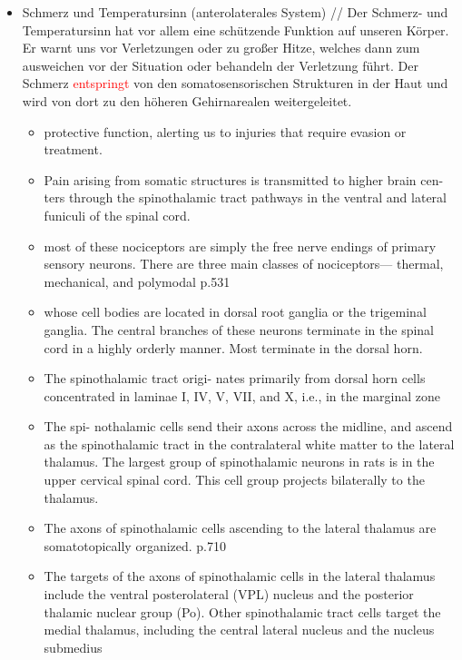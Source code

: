 \documentclass[12pt,a4paper,pdftex]{article}
\begin{document}
\begin{itemize}
    \item Schmerz und Temperatursinn (anterolaterales System)
    //
    Der Schmerz- und Temperatursinn hat vor allem eine schützende Funktion auf unseren Körper. Er warnt uns vor Verletzungen oder zu großer Hitze, welches dann zum ausweichen vor der Situation oder behandeln der Verletzung führt. Der Schmerz \textcolor{red}{entspringt} von den somatosensorischen Strukturen in der Haut und wird von dort zu den höheren Gehirnarealen weitergeleitet. 
    \begin{itemize}
        \item protective function, alerting us to injuries that require evasion or treatment. \cite{kandel2013principles}
        \item Pain arising from
        somatic structures is transmitted to higher brain cen-
        ters through the spinothalamic tract pathways in the
        ventral and lateral funiculi of the spinal cord. \cite{paxinos2014rat}
        \item most of these nociceptors
        are simply the free nerve endings of primary sensory
        neurons. There are three main classes of nociceptors—
        thermal, mechanical, and polymodal \cite{kandel2013principles} p.531
        \item whose cell bodies are located in dorsal root
        ganglia or the trigeminal ganglia. The central branches
        of these neurons terminate in the spinal cord in a highly
        orderly manner. Most terminate in the dorsal horn. \cite{kandel2013principles}
        \item The spinothalamic tract origi-
        nates primarily from dorsal horn cells concentrated in
        laminae I, IV, V, VII, and X, i.e., in the marginal zone \cite{paxinos2014rat}
        \item The spi-
        nothalamic cells send their axons across the midline, and
        ascend as the spinothalamic tract in the contralateral white matter to the lateral thalamus. The largest group of spinothalamic neurons in rats is in the upper cervical spinal cord. This cell group projects bilaterally to the thalamus. \cite{paxinos2014rat}
        \item The axons of spinothalamic cells ascending to the lateral thalamus are somatotopically organized. \cite{paxinos2014rat} p.710
        \item The targets of the axons of spinothalamic cells in the lateral thalamus include the ventral posterolateral (VPL) nucleus and the posterior thalamic nuclear group (Po). Other spinothalamic tract cells target the medial thalamus, including the central lateral nucleus and the nucleus submedius \cite{paxinos2014rat}

\end{itemize}
\end{itemize}
\end{document}
